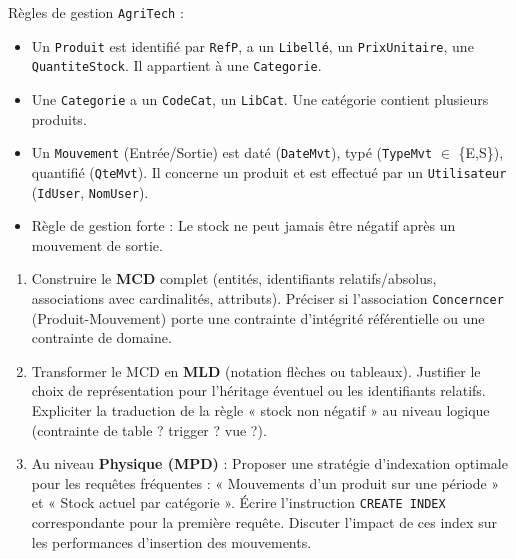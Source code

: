\documentclass[11pt]{article}
\begin{document}
\begin{exercice}
Règles de gestion \texttt{AgriTech} : 
\begin{itemize}
    \item Un \texttt{Produit} est identifié par \texttt{RefP}, a un \texttt{Libellé}, un \texttt{PrixUnitaire}, une \texttt{QuantiteStock}. Il appartient à une \texttt{Categorie}.
    \item Une \texttt{Categorie} a un \texttt{CodeCat}, un \texttt{LibCat}. Une catégorie contient plusieurs produits.
    \item Un \texttt{Mouvement} (Entrée/Sortie) est daté (\texttt{DateMvt}), typé (\texttt{TypeMvt} $\in$ \{E,S\}), quantifié (\texttt{QteMvt}). Il concerne un produit et est effectué par un \texttt{Utilisateur} (\texttt{IdUser}, \texttt{NomUser}).
    \item Règle de gestion forte : Le stock ne peut jamais être négatif après un mouvement de sortie.
\end{itemize}
\begin{enumerate}
    \item Construire le \textbf{MCD} complet (entités, identifiants relatifs/absolus, associations avec cardinalités, attributs). Préciser si l'association \texttt{Concerncer} (Produit-Mouvement) porte une contrainte d'intégrité référentielle ou une contrainte de domaine.
    \item Transformer le MCD en \textbf{MLD} (notation flèches ou tableaux). Justifier le choix de représentation pour l'héritage éventuel ou les identifiants relatifs. Expliciter la traduction de la règle « stock non négatif » au niveau logique (contrainte de table ? trigger ? vue ?).
    \item Au niveau \textbf{Physique (MPD)} : Proposer une stratégie d'indexation optimale pour les requêtes fréquentes : « Mouvements d'un produit sur une période » et « Stock actuel par catégorie ». Écrire l'instruction \texttt{CREATE INDEX} correspondante pour la première requête. Discuter l'impact de ces index sur les performances d'insertion des mouvements.
\end{enumerate}
\end{exercice}
\end{document}
